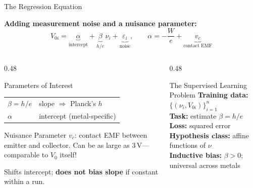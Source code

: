 \documentclass[aspectratio=169,12pt]{beamer}
\begin{document}
\begin{frame}[shrink=8]{The Regression Equation}

\textbf{Adding measurement noise and a nuisance parameter:}
\begin{equation*}
  V_{0i} = \underbrace{\alpha}_{\text{intercept}} +
            \underbrace{\beta}_{\displaystyle h/e}\,\nu_i +
            \underbrace{\varepsilon_i}_{\text{noise}},
  \qquad
  \alpha = -\frac{W}{e} + \underbrace{v_c}_{\text{contact EMF}}
\end{equation*}

\medskip
\begin{columns}[T]
\begin{column}{0.48\textwidth}
\begin{block}{Parameters of Interest}
\begin{tabular}{ll}
$\beta = h/e$ & slope $\Rightarrow$ Planck's $h$ \\
$\alpha$      & intercept (metal-specific) \\
\end{tabular}
\end{block}

\medskip
\begin{block}{Nuisance Parameter}
$v_c$: contact EMF between emitter
and collector.  Can be as large
as 3\,V---comparable to $V_0$ itself!

\smallskip
Shifts intercept; \textbf{does not bias slope}
if constant within a run.
\end{block}
\end{column}
\begin{column}{0.48\textwidth}
\begin{alertblock}{The Supervised Learning Problem}
\textbf{Training data:} $\{(\nu_i, V_{0i})\}_{i=1}^n$\\[4pt]
\textbf{Task:} estimate $\beta = h/e$\\[4pt]
\textbf{Loss:} squared error\\[4pt]
\textbf{Hypothesis class:} affine functions of $\nu$\\[4pt]
\textbf{Inductive bias:} $\beta > 0$; universal across metals
\end{alertblock}
\end{column}
\end{columns}

\end{frame}
\end{document}
